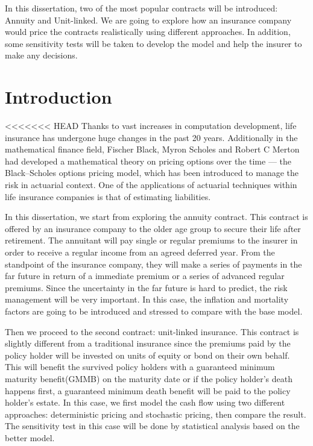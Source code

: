 \documentclass{report}
\begin{document}
In this dissertation, two of the most popular contracts will be introduced:
Annuity and Unit-linked. We are going to explore how an insurance
company would price the contracts realistically using different approaches.  In
addition, some sensitivity tests will be taken to develop the model and help the
insurer to make any decisions.






\chapter*{Introduction}


<<<<<<< HEAD
Thanks to vast increases in computation development, life insurance has
undergone huge changes in the past 20 years. Additionally in the mathematical
finance field, Fischer Black, Myron Scholes and Robert C Merton had developed
a mathematical theory on pricing options over the time --- the
Black--Scholes options pricing model, which has been introduced to manage
the risk in actuarial context. One of the applications of actuarial
techniques within life insurance companies is that of estimating liabilities.


In this dissertation, we start from exploring the annuity contract. This
contract is offered by an insurance company to the older age group to secure their
life after retirement. The annuitant will pay single or regular premiums to
the insurer in order to receive a regular income from an agreed deferred year.
From the standpoint of the insurance company, they will make a series of
payments in the far future in return of a immediate premium or a series of
advanced regular premiums. Since the uncertainty in the far future is hard to
predict, the risk management will be very important. In this case, the
inflation and mortality factors are going to be introduced and stressed to
compare with the base model.


Then we proceed to the second contract: unit-linked insurance. This contract is slightly different from a traditional insurance since the premiums paid by the policy holder will be invested on units of equity or bond on their own behalf. This will benefit the survived policy holders with a guaranteed minimum maturity benefit(GMMB) on the maturity date or if the policy holder's death happens first, a guaranteed minimum death benefit will be paid to the policy holder's estate. In this case, we first model the cash flow using two different approaches: deterministic pricing and stochastic pricing, then compare the result. The sensitivity test in this case will be done by statistical analysis based on the better model.
\end{document}
